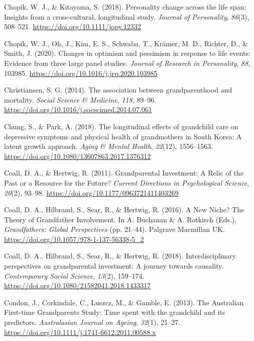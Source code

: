 \documentclass[
  english,
  man, noextraspace]{apa7}
\begin{document}
\leavevmode\hypertarget{ref-chopikPersonalityChangeLife2018}{}%
Chopik, W. J., \& Kitayama, S. (2018). Personality change across the life span: Insights from a cross-cultural, longitudinal study. \emph{Journal of Personality}, \emph{86}(3), 508--521. \url{https://doi.org/10.1111/jopy.12332}

\leavevmode\hypertarget{ref-chopikChangesOptimismPessimism2020}{}%
Chopik, W. J., Oh, J., Kim, E. S., Schwaba, T., Krämer, M. D., Richter, D., \& Smith, J. (2020). Changes in optimism and pessimism in response to life events: Evidence from three large panel studies. \emph{Journal of Research in Personality}, \emph{88}, 103985. \url{https://doi.org/10.1016/j.jrp.2020.103985}

\leavevmode\hypertarget{ref-christiansenAssociationGrandparenthoodMortality2014}{}%
Christiansen, S. G. (2014). The association between grandparenthood and mortality. \emph{Social Science \& Medicine}, \emph{118}, 89--96. \url{https://doi.org/10.1016/j.socscimed.2014.07.061}

\leavevmode\hypertarget{ref-chungLongitudinalEffectsGrandchild2018}{}%
Chung, S., \& Park, A. (2018). The longitudinal effects of grandchild care on depressive symptoms and physical health of grandmothers in South Korea: A latent growth approach. \emph{Aging \& Mental Health}, \emph{22}(12), 1556--1563. \url{https://doi.org/10.1080/13607863.2017.1376312}

\leavevmode\hypertarget{ref-coallGrandparentalInvestmentRelic2011}{}%
Coall, D. A., \& Hertwig, R. (2011). Grandparental Investment: A Relic of the Past or a Resource for the Future? \emph{Current Directions in Psychological Science}, \emph{20}(2), 93--98. \url{https://doi.org/10.1177/0963721411403269}

\leavevmode\hypertarget{ref-coallNewNicheTheory2016}{}%
Coall, D. A., Hilbrand, S., Sear, R., \& Hertwig, R. (2016). A New Niche? The Theory of Grandfather Involvement. In A. Buchanan \& A. Rotkirch (Eds.), \emph{Grandfathers: Global Perspectives} (pp. 21--44). Palgrave Macmillan UK. \url{https://doi.org/10.1057/978-1-137-56338-5_2}

\leavevmode\hypertarget{ref-coallInterdisciplinaryPerspectivesGrandparental2018}{}%
Coall, D. A., Hilbrand, S., Sear, R., \& Hertwig, R. (2018). Interdisciplinary perspectives on grandparental investment: A journey towards causality. \emph{Contemporary Social Science}, \emph{13}(2), 159--174. \url{https://doi.org/10.1080/21582041.2018.1433317}

\leavevmode\hypertarget{ref-condonAustralianFirsttimeGrandparents2013}{}%
Condon, J., Corkindale, C., Luszcz, M., \& Gamble, E. (2013). The Australian First-time Grandparents Study: Time spent with the grandchild and its predictors. \emph{Australasian Journal on Ageing}, \emph{32}(1), 21--27. \url{https://doi.org/10.1111/j.1741-6612.2011.00588.x}
\end{document}
